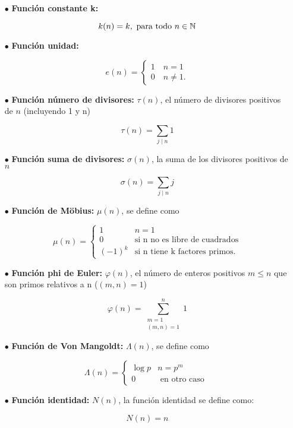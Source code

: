 \begin{itemize}
\item[$\bullet$] \textbf{Función constante k:}

$$k(n)=k, \text{ para todo } n \in \mathbb{N} $$

\item[$\bullet$] \textbf{Función unidad:}

$$e(n)=\begin{cases}
1 \quad n=1\\
0 \quad n\neq 1.
\end{cases}$$

\item[$\bullet$] \textbf{Función número de divisores:} $\tau(n)$, el número de divisores positivos de $n$ (incluyendo 1 y n)

$$\tau(n)=\sum_{j\mid n}1$$

\item[$\bullet$] \textbf{Función suma de divisores:} $\sigma(n)$, la suma de los divisores positivos de $n$

$$\sigma(n)=\sum_{j\mid n}j$$

\item[$\bullet$] \textbf{Función de Möbius:} $\mu(n)$, se define como

$$\mu(n)=\begin{cases}
1  &n=1\\
0  &\text{si n no es libre de cuadrados}\\
(-1)^k &\text{si n tiene k factores primos.}
\end{cases}$$

\item[$\bullet$] \textbf{Función phi de Euler:} $\varphi(n)$, el número de enteros positivos $m\leq n$ que son primos relativos a n ($(m,n)=1$)

$$\varphi(n)=\sum_{\substack{m=1 \\(m, n)=1}}^n 1$$

\item[$\bullet$]\textbf{Función de Von Mangoldt:} $\Lambda(n)$, se define como

$$\Lambda(n)= \begin{cases}\log p & n=p^m \\ 0 & \text { en otro caso }\end{cases}$$

\item[$\bullet$]\textbf{Función identidad:} $N(n)$, la función identidad se define como:

$$N(n)=n$$ 

\end{itemize}

